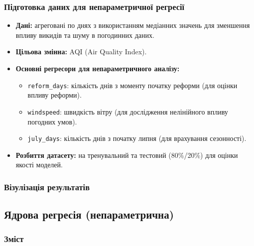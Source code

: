 ﻿\documentclass{beamer}
\begin{document}
\begin{frame}
  \frametitle{Підготовка даних для непараметричної регресії}
  \begin{itemize}
    \item \textbf{Дані:} агреговані по днях з використанням медіанних значень для зменшення впливу викидів та шуму в погодинних даних.
    \item \textbf{Цільова змінна:} AQI (Air Quality Index).
    \item \textbf{Основні регресори для непараметричного аналізу:}
        \begin{itemize}
            \item \texttt{reform\_days}: кількість днів з моменту початку реформи (для оцінки впливу реформи).
            \item \texttt{windspeed}: швидкість вітру (для дослідження нелінійного впливу погодних умов).
            \item \texttt{july\_days}: кількість днів з початку липня (для врахування сезонності).
        \end{itemize}
    \item \textbf{Розбиття датасету:} на тренувальний та тестовий (80\%/20\%) для оцінки якості моделей.
  \end{itemize}
\end{frame}

\begin{frame}
  \frametitle{Візулізація результатів}
\end{frame}


\begin{frame}
  \section{Ядрова регресія (непараметрична)}

  \frametitle{Зміст}
  \tableofcontents[currentsection]
\end{frame}
\end{document}
